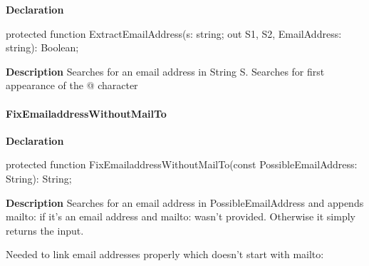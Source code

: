 \documentclass{report}
\newif\ifpdf
\begin{document}
\label{PasDoc_Gen.TDocGenerator-ExtractEmailAddress}
\begin{list}{}{
\setlength{\itemindent}{0cm}
\setlength{\listparindent}{0cm}
\setlength{\leftmargin}{\evensidemargin}
\addtolength{\leftmargin}{\tmplength}
\settowidth{\labelsep}{X}
\addtolength{\leftmargin}{\labelsep}
\setlength{\labelwidth}{\tmplength}
}
\item[\textbf{Declaration}\hfill]
\ifpdf
\begin{flushleft}
\fi
\begin{ttfamily}
protected function ExtractEmailAddress(s: string; out S1, S2, EmailAddress: string): Boolean;\end{ttfamily}

\ifpdf
\end{flushleft}
\fi

\par
\item[\textbf{Description}]
Searches for an email address in String S. Searches for first appearance of the @ character

\end{list}
\paragraph*{FixEmailaddressWithoutMailTo}\hspace*{\fill}

\label{PasDoc_Gen.TDocGenerator-FixEmailaddressWithoutMailTo}
\begin{list}{}{
\setlength{\itemindent}{0cm}
\setlength{\listparindent}{0cm}
\setlength{\leftmargin}{\evensidemargin}
\addtolength{\leftmargin}{\tmplength}
\settowidth{\labelsep}{X}
\addtolength{\leftmargin}{\labelsep}
\setlength{\labelwidth}{\tmplength}
}
\item[\textbf{Declaration}\hfill]
\ifpdf
\begin{flushleft}
\fi
\begin{ttfamily}
protected function FixEmailaddressWithoutMailTo(const PossibleEmailAddress: String): String;\end{ttfamily}

\ifpdf
\end{flushleft}
\fi

\par
\item[\textbf{Description}]
Searches for an email address in PossibleEmailAddress and appends mailto: if it's an email address and mailto: wasn't provided. Otherwise it simply returns the input.

Needed to link email addresses properly which doesn't start with mailto:

\end{list}
\end{document}
